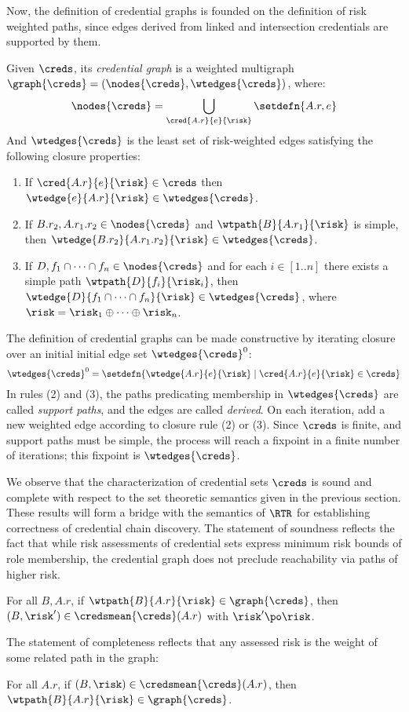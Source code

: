 Now, the definition of credential graphs is founded on the definition of
risk weighted paths, since edges derived from linked and intersection
credentials are supported by them.  
\begin{definition}
\label{def-credentialgraph}
Given $\creds$, its \emph{credential graph} is a weighted multigraph
$\graph{\creds} = (\nodes{\creds}, \wtedges{\creds})$, where:
$$
\nodes{\creds} = \bigcup\limits_{\cred{A.r}{e}{\risk}} \setdefn{A.r,e}
$$
And $\wtedges{\creds}$ is the least set of risk-weighted edges satisfying 
the following closure properties:
\begin{enumerate}
\item If $\cred{A.r}{e}{\risk} \in \creds$ then 
$\wtedge{e}{A.r}{\risk} \in \wtedges{\creds}$.
\item If $B.r_2, A.r_1.r_2 \in \nodes{\creds}$ and
$\wtpath{B}{A.r_1}{\risk}$ is simple, then
$\wtedge{B.r_2}{A.r_1.r_2}{\risk} \in \wtedges{\creds}$.
\item If $D,f_1\cap \cdots \cap f_n \in \nodes{\creds}$ and for each
$i \in [1..n]$ there exists a simple path
$\wtpath{D}{f_i}{\risk_i}$, then $\wtedge{D}{f_1 \cap \cdots \cap
f_n}{\risk} \in \wtedges{\creds}$, where $\risk = \risk_1 \oplus
\cdots \oplus \risk_n$.
\end{enumerate}
\end{definition}

The definition of credential graphs can be made constructive by
iterating closure over an initial initial edge set
$\wtedges{\creds}^0$:
$$
\wtedges{\creds}^0 = \setdefn{\wtedge{A.r}{e}{\risk} \mid 
\cred{A.r}{e}{\risk} \in \creds}
$$ 
In rules (2) and (3), the paths predicating membership in
$\wtedges{\creds}$ are called \emph{support paths}, and the edges are
called \emph{derived}.  On each iteration, add a new weighted edge
according to closure rule (2) or (3).  Since $\creds$ is finite, and
support paths must be simple, the process will reach a fixpoint in
a finite number of iterations; this fixpoint is $\wtedges{\creds}$.

We observe that the characterization of credential sets $\creds$
is sound and complete with respect to the set theoretic semantics
given in the previous section.  These results will form a 
bridge with the semantics of $\RTR$ for establishing correctness
of credential chain discovery.  The statement of soundness reflects
the fact that while risk assessments of credential sets express
minimum risk bounds of role membership, the credential graph 
does not preclude reachability via paths of higher risk.
\begin{theorem}[Soundness]
For all $B,A.r$, if $\wtpath{B}{A.r}{\risk} \in \graph{\creds}$, then
$(B,\risk') \in \credsmean{\creds}(A.r)$ with $\risk' \po \risk$.
\end{theorem}
The statement of completeness reflects that any assessed risk is the
weight of some related path in the graph:
\begin{theorem}[Completeness]
For all $A.r$, if $(B,\risk) \in \credsmean{\creds}(A.r)$, then 
$\wtpath{B}{A.r}{\risk} \in \graph{\creds}$.
\end{theorem}

